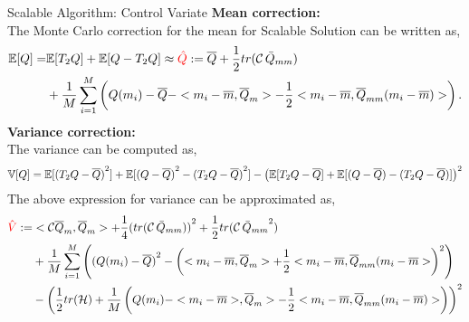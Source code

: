 \documentclass[10pt,xcolor=dvipsnames,compress]{beamer}
\begin{document}
\begin{frame}{Scalable Algorithm: Control Variate}
\footnotesize
\textbf{Mean correction:}\\
The Monte Carlo correction for the mean for Scalable Solution can be written as, 
\begin{align*}
    \mathbb{E}[Q]  = & \mathbb{E}[T_2 Q] + \mathbb{E}[Q - T_2 Q] \approx \textcolor{red}{\hat{Q}} := \overline{Q} + \frac{1}{2} tr(\mathcal{C}\,\Bar{Q}_{mm})\\
                       & + \frac{1}{M} \sum_{i=1}^{M}\left( Q(m_i) - \overline{Q} - <m_i - \overline{m}, \overline{Q}_m > - \frac{1}{2} <m_i - \overline{m}, \overline{Q}_{mm} (m_i - \overline{m})> \right).\\
\end{align*}
\textbf{Variance correction:}\\
The variance can be computed as,
\scriptsize{
\begin{align*}
       \hspace{-0.01in} \mathbb{V}[Q] = \mathbb{E}[{(T_2 Q - \overline{Q})}^2]+ \mathbb{E}[{(Q - \overline{Q})}^2-{(T_2 Q - \overline{Q})}^2]-{\left( \mathbb{E}[T_2 Q - \overline{Q}] + \mathbb{E}[(Q - \overline{Q})-(T_2 Q - \overline{Q})] \right)}^2
\end{align*}}
\footnotesize{The above expression for variance can be approximated as,}
\scriptsize{
\begin{align*}
        \textcolor{red}{\hat{{V}}}:= &< \mathcal{C} \overline{Q}_{m}, \overline{Q}_{m}> + \frac{1}{4}{(tr(\mathcal{C}\,\Bar{Q}_{mm}))}^2 + \frac{1}{2} tr({\mathcal{C}\,\Bar{Q}_{mm}}^2)\\
        & + \frac{1}{M}\sum_{i=1}^{M} \left( {(Q(m_i) - \overline{Q})}^2 - {\left(<m_i - \overline{m}, \overline{Q}_m> +\frac{1}{2} <m_i - \overline{m}, \overline{Q}_{mm} (m_i - \overline{m}> \right)}^2 \right) \\
        & - {\left( \frac{1}{2}tr(\mathcal{H}) + \frac{1}{M} \left( Q(m_i) -<m_i - \overline{m}>,\overline{Q}_m> - \frac{1}{2}<m_i - \overline{m},\overline{Q}_{mm} (m_i - \overline{m})> \right) \right)}^2
\end{align*}}
\end{frame}
\end{document}
